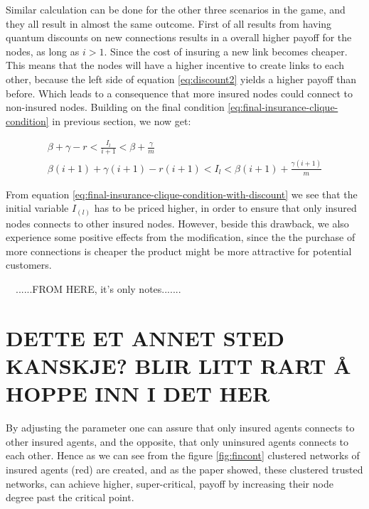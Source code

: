 Similar calculation can be done for the other three scenarios in the game, and they all result in almost the same outcome. First of all results from having quantum discounts on new connections results in a overall higher payoff for the nodes, as long as $i>1$. Since the cost of insuring a new link becomes cheaper. This means that the nodes will have a higher incentive to create links to each other, because the left side of equation \ref{eq:discount2} yields a higher payoff than before. Which leads to a consequence that more insured nodes could connect to non-insured nodes. 
Building on the final condition \ref{eq:final-insurance-clique-condition} in previous section, we now get:

\begin{eqnarray}
\beta+\gamma-r<\frac{I_{l}}{i+1}<\beta+\frac{\gamma}{m} \nonumber \\
\beta(i+1)+\gamma(i+1)-r(i+1)<I_{l}<\beta(i+1)+\frac{\gamma(i+1)}{m}
\label{eq:final-insurance-clique-condition-with-discount}
\end{eqnarray}

From equation \ref{eq:final-insurance-clique-condition-with-discount} we see that the initial variable $I_(l)$ has to be priced higher, in order to ensure that only insured nodes connects to other insured nodes. However, beside this drawback, we also experience some positive effects from the modification, since the the purchase of more connections is cheaper the product might be more attractive for potential customers. 

\
\
......FROM HERE, it's only notes.......

\section{DETTE ET ANNET STED KANSKJE? BLIR LITT RART Å HOPPE INN I DET HER}
By adjusting the parameter one can assure that only insured agents connects to other insured agents, and the opposite,
that only uninsured agents connects to each other. Hence as we can see from the figure \ref{fig:fincont} clustered
networks of insured agents (red) are created, and  as the paper \cite{contagion} showed, these clustered trusted
networks, can achieve higher, super-critical, payoff by increasing their node degree past the critical point.

